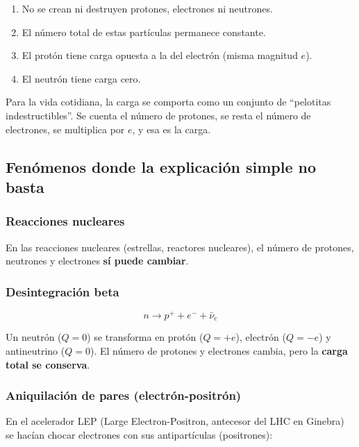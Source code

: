 \documentclass[12pt,a4paper]{article}
\begin{document}
\begin{enumerate}[nosep]
  \item No se crean ni destruyen protones, electrones ni neutrones.
  \item El número total de estas partículas permanece constante.
  \item El protón tiene carga opuesta a la del electrón (misma magnitud
        $e$).
  \item El neutrón tiene carga cero.
\end{enumerate}

\begin{notebox}
  Para la vida cotidiana, la carga se comporta como un conjunto de
  ``pelotitas indestructibles''. Se cuenta el número de protones, se
  resta el número de electrones, se multiplica por $e$, y esa es la
  carga.
\end{notebox}

\subsection{Fenómenos donde la explicación simple no basta}

\subsubsection{Reacciones nucleares}

En las reacciones nucleares (estrellas, reactores nucleares), el número
de protones, neutrones y electrones \textbf{sí puede cambiar}.

\subsubsection{Desintegración beta}

\[
n \longrightarrow p^{+} + e^{-} + \bar{\nu}_e
\]

Un neutrón ($Q = 0$) se transforma en protón ($Q = +e$), electrón
($Q = -e$) y antineutrino ($Q = 0$). El número de protones y electrones
cambia, pero la \textbf{carga total se conserva}.

\subsubsection{Aniquilación de pares (electrón-positrón)}

En el acelerador LEP (Large Electron-Positron, antecesor del LHC en
Ginebra) se hacían chocar electrones con sus antipartículas
(positrones):
\end{document}
